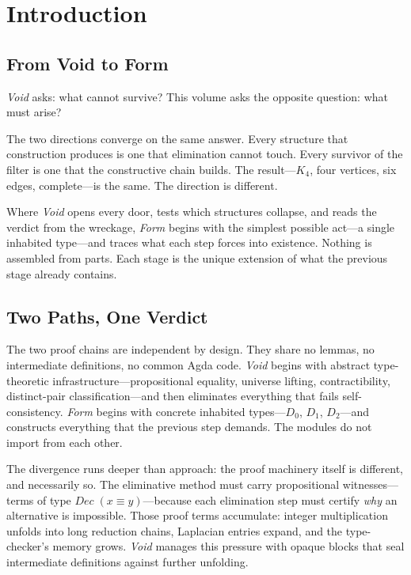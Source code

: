 \documentclass[11pt,a4paper]{book}
\def\texttt#1{#1}%
\def\text#1{#1}%
\begin{document}
\chapter*{Introduction}

\section*{From Void to Form}

\textit{Void} asks: what cannot survive? This volume asks the opposite question: what must arise?

The two directions converge on the same answer. Every structure that construction produces is one that elimination cannot touch. Every survivor of the filter is one that the constructive chain builds. The result---$K_4$, four vertices, six edges, complete---is the same. The direction is different.

Where \textit{Void} opens every door, tests which structures collapse, and reads the verdict from the wreckage, \textit{Form} begins with the simplest possible act---a single inhabited type---and traces what each step forces into existence. Nothing is assembled from parts. Each stage is the unique extension of what the previous stage already contains.

\section*{Two Paths, One Verdict}

The two proof chains are independent by design. They share no lemmas, no intermediate definitions, no common Agda code. \textit{Void} begins with abstract type-theoretic infrastructure---propositional equality, universe lifting, contractibility, distinct-pair classification---and then eliminates everything that fails self-consistency. \textit{Form} begins with concrete inhabited types---$D_0$, $D_1$, $D_2$---and constructs everything that the previous step demands. The modules do not import from each other.

The divergence runs deeper than approach: the proof machinery itself is different, and necessarily so. The eliminative method must carry propositional witnesses---terms of type $\text{Dec}\;(x \equiv y)$---because each elimination step must certify \emph{why} an alternative is impossible. Those proof terms accumulate: integer multiplication unfolds into long reduction chains, Laplacian entries expand, and the type-checker's memory grows. \textit{Void} manages this pressure with \texttt{opaque} blocks that seal intermediate definitions against further unfolding.
\end{document}
